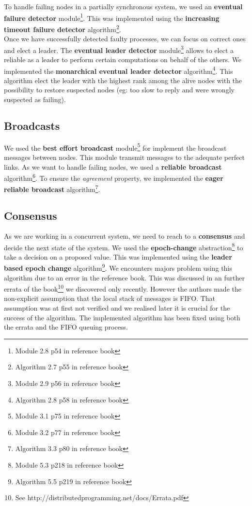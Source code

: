 \documentclass[11pt,english,a4paper]{article}
\begin{document}
To handle failing nodes in a partially synchronous system, we used an \textbf{eventual failure detector} module\footnote{Module 2.8 p54 in reference book}.
This was implemented using the \textbf{increasing timeout failure detector} algorithm\footnote{Algorithm 2.7 p55 in reference book}.\\

Once we have successfully detected faulty processes, we can focus on correct ones and elect a leader.
The \textbf{eventual leader detector} module\footnote{Module 2.9 p56 in reference book} allows to elect a reliable as a leader to perform certain computations on behalf of the others.
We implemented the \textbf{monarchical eventual leader detector} algorithm\footnote{Algorithm 2.8 p58 in reference book}.
This algorithm elect the leader with the highest rank among the alive nodes with the possibility to restore suspected nodes (eg: too slow to reply and were wrongly suspected as failing).

\subsection*{Broadcasts}
We used the \textbf{best effort broadcast} module\footnote{Module 3.1 p75 in reference book} for implement the broadcast messages between nodes.
This module transmit messages to the adequate perfect links.
As we want to handle failing nodes, we used a \textbf{reliable broadcast} algorithm\footnote{Module 3.2 p77 in reference book}.
To ensure the \emph{agreement} property, we implemented the \textbf{eager reliable broadcast} algorithm\footnote{Algorithm 3.3 p80 in reference book}.


\subsection*{Consensus}
As we are working in a concurrent system, we need to reach to a \textbf{consensus} and decide the next state of the system.
We used the \textbf{epoch-change} abstraction\footnote{Module 5.3 p218 in reference book} to take a decision on a proposed value.
This was implemented using the \textbf{leader based epoch change} algorithm\footnote{Algorithm 5.5 p219 in reference book}.
We encounters majors problem using this algorithm due to an error in the reference book.
This was discussed in an further errata of the book\footnote{See http://distributedprogramming.net/docs/Errata.pdf} we discovered only recently.
However the authors made the non-explicit assumption that the local stack of messages is FIFO.
That assumption was at first not verified and we realised later it is crucial for the success of the algorithm.
The implemented algorithm has been fixed using both the errata and the FIFO queuing process.\\
\end{document}
